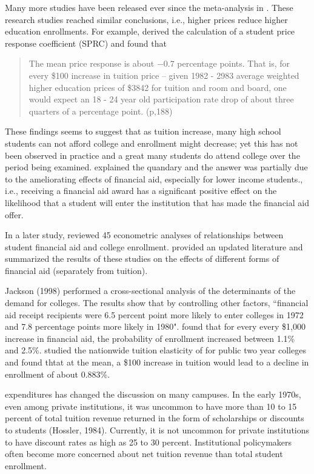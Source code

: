 \documentclass[12pt,english]{report}
\begin{document}
Many more studies have been released ever since the meta-analysis in
\citep{Leslie1987}. These research studies reached similar conclusions, i.e.,
higher prices reduce higher education enrollments.  For
example,\citet{Leslie1987} derived the calculation of a student price response
coefficient (SPRC) and found that
\begin{quote} 
The mean price response is about $-0.7$ percentage points. That is, for every
\$100 increase in tuition price -- given 1982 - 2983 average weighted higher
education prices of \$3842 for tuition and room and board, one would expect an
18 - 24 year old participation rate drop of about three quarters of a
percentage point. (p,188)
\end{quote} 

These findings seems to suggest that as tuition increase, many high school
students can not afford college and enrollment might decrease; yet this has not
been observed in practice and a great many students do attend college over the
period being examined. \citet{Leslie1987} explained the quandary and the answer
was partially due to the ameliorating effects of financial aid, especially for
lower income students., i.e., receiving a financial aid award has a significant
positive effect on the likelihood that a student will enter the institution
that has made the financial aid offer.

In a later study, \citet{Leslie1988} reviewed 45 econometric analyses of
relationships between student financial aid and college enrollment.
\citet{Heller1997} provided an updated literature and summarized the results of
these studies on the effects of different forms of financial aid (separately
from tuition).

Jackson (1998) performed a cross-sectional analysis of the determinants of the
demand for colleges.  The results show that by controlling other factors,
``financial aid receipt recipients were 6.5 percent point more likely to enter
colleges in 1972 and 7.8 percentage points more likely in 1980".
\citet{Braunstein1999} found that for every every \$1,000 increase in financial
aid, the probability  of  enrollment increased between 1.1\% and 2.5\%.
\citet{Crouse2015} studied the nationwide tuition elasticity of for public two
year colleges and found thtat at the mean, a \$100 increase in tuition would
lead to a decline in enrollment of about 0.883\%.

expenditures has changed the discussion on many campuses. In the early 1970s,
even among private institutions, it was uncommon to have more than 10 to 15
percent of total tuition revenue returned in the form of scholarships or
discounts to students (Hossler, 1984). Currently, it is not uncommon for
private institutions to have discount rates as high as 25 to 30 percent.
Institutional policymakers often become more concerned about net tuition
revenue than total student enrollment.
\end{document}
